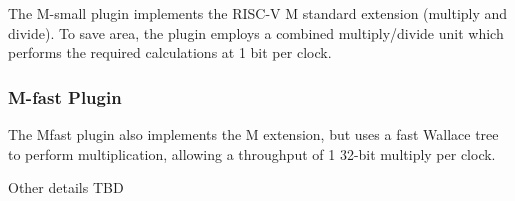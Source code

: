 The M-small plugin implements the RISC-V M standard extension (multiply and divide). To save area, the plugin employs a combined multiply/divide unit which performs the required calculations at 1 bit per clock.

\subsubsection{M-fast Plugin}

The Mfast plugin also implements the M extension, but uses a fast Wallace tree to perform multiplication, allowing a throughput of 1 32-bit multiply per clock.

Other details TBD
